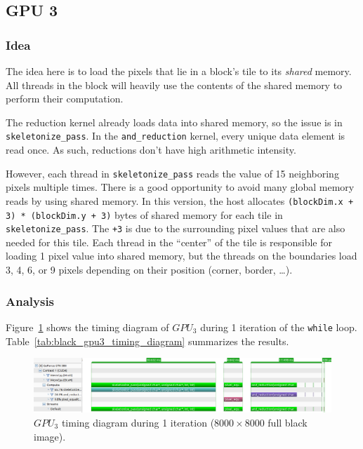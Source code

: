 \documentclass[11pt,a4paper]{article}
\begin{document}
        \subsection{GPU 3}
            \label{sec:solution_3}

            \subsubsection{Idea}
                The idea here is to load the pixels that lie in a block's tile to its \emph{shared} memory.
                All threads in the block will heavily use the contents of the shared memory to perform their computation.

                The reduction kernel already loads data into shared memory, so the issue is in \verb+skeletonize_pass+.
                In the \verb+and_reduction+ kernel, every unique data element is read once.
                As such, reductions don't have high arithmetic intensity.

                However, each thread in \verb+skeletonize_pass+ reads the value of 15 neighboring pixels multiple times.
                There is a good opportunity to avoid many global memory reads by using shared memory.
                In this version, the host allocates \verb|(blockDim.x + 3) * (blockDim.y + 3)| bytes of shared memory for each tile in \verb+skeletonize_pass+.
                The \verb|+3| is due to the surrounding pixel values that are also needed for this tile.
                Each thread in the ``center'' of the tile is responsible for loading 1 pixel value into shared memory, but the threads on the boundaries load 3, 4, 6, or 9 pixels depending on their position (corner, border, \ldots).

            \subsubsection{Analysis}
                Figure~\ref{fig:black_gpu3_timing_diagram} shows the timing diagram of $GPU_{3}$ during 1 iteration of the \verb+while+ loop.
                Table~\ref{tab:black_gpu3_timing_diagram} summarizes the results.

                \begin{figure}[h]
                    \centering
                    \includegraphics[width=\textwidth]{figs/black_gpu3_timing_diagram.png}
                    \caption{$GPU_{3}$ timing diagram during 1 iteration ($8000 \times 8000$ full black image).}
                    \label{fig:black_gpu3_timing_diagram}
                \end{figure}
\end{document}
